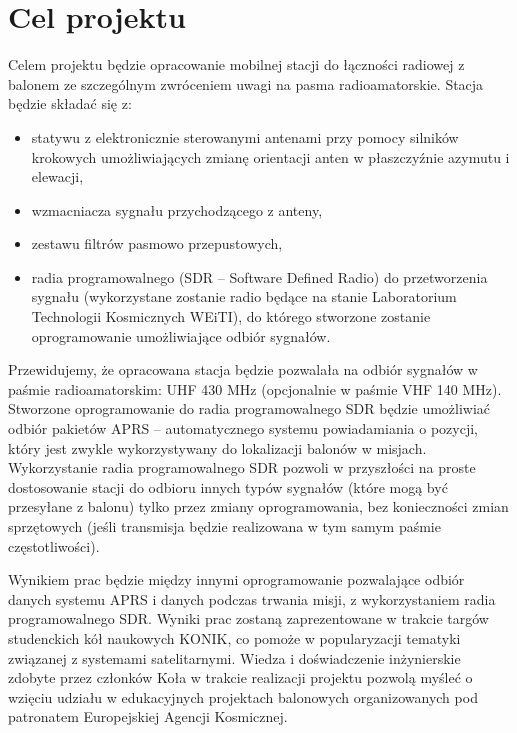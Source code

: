 \section{Cel projektu}

Celem projektu będzie opracowanie mobilnej stacji do łączności radiowej z balonem ze szczególnym zwróceniem uwagi na pasma radioamatorskie. Stacja będzie składać się z:
\begin{itemize}
    \item statywu z elektronicznie sterowanymi antenami przy pomocy silników krokowych umożliwiających zmianę orientacji anten w płaszczyźnie azymutu i elewacji,
    \item wzmacniacza sygnału przychodzącego z anteny,
    \item zestawu filtrów pasmowo przepustowych,
    \item radia programowalnego (SDR – Software Defined Radio) do przetworzenia sygnału (wykorzystane zostanie radio będące na stanie Laboratorium Technologii Kosmicznych WEiTI), do którego stworzone zostanie oprogramowanie umożliwiające odbiór sygnałów.
\end{itemize}  

	Przewidujemy, że opracowana stacja będzie pozwalała na odbiór sygnałów w paśmie radioamatorskim: UHF 430 MHz (opcjonalnie w paśmie VHF 140 MHz). 
	Stworzone oprogramowanie do radia programowalnego SDR będzie umożliwiać odbiór pakietów APRS – automatycznego systemu powiadamiania o pozycji, który jest zwykle wykorzystywany do lokalizacji balonów w misjach. Wykorzystanie radia programowalnego SDR pozwoli w przyszłości na proste dostosowanie stacji do odbioru innych typów sygnałów (które mogą być przesyłane z  balonu) tylko przez zmiany oprogramowania, bez konieczności zmian sprzętowych (jeśli transmisja będzie realizowana w tym samym paśmie częstotliwości).

	Wynikiem prac będzie między innymi oprogramowanie pozwalające odbiór danych systemu APRS i danych podczas trwania misji, z wykorzystaniem radia programowalnego SDR.
	Wyniki prac zostaną zaprezentowane w trakcie targów studenckich kół naukowych KONIK, co pomoże w popularyzacji tematyki związanej z systemami satelitarnymi.
	Wiedza i doświadczenie inżynierskie  zdobyte przez członków Koła w trakcie realizacji projektu pozwolą myśleć o wzięciu udziału w edukacyjnych projektach balonowych organizowanych pod patronatem Europejskiej Agencji Kosmicznej.